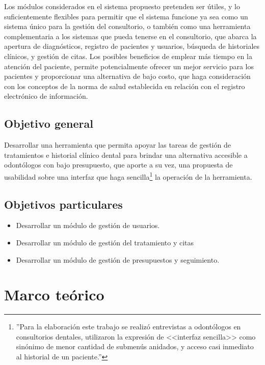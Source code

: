 \vspace{1em}

Los módulos considerados en el sistema propuesto pretenden ser útiles, y lo suficientemente flexibles para permitir que el sistema funcione ya sea como un sistema único para la gestión del consultorio, o también como una herramienta complementaria a los sistemas que pueda tenerse en el consultorio, que abarca la apertura de diagnósticos, registro de pacientes y usuarios, búsqueda de historiales clínicos, y gestión de citas. Los posibles beneficios de emplear más tiempo en la atención del paciente, permite potencialmente ofrecer un mejor servicio para los pacientes y proporcionar una alternativa de bajo costo, que haga consideración con los conceptos de la norma de salud establecida en relación con el registro electrónico de información.


\subsection{Objetivo general}

Desarrollar una herramienta que permita apoyar las tareas de gestión de tratamientos e historial clínico dental para brindar una alternativa accesible a odontólogos con bajo presupuesto, que aporte a su vez, una propuesta de usabilidad sobre una interfaz que haga sencilla\footnote{''Para la elaboración este trabajo se realizó entrevistas a odontólogos en consultorios dentales, utilizaron la expresión de <<interfaz sencilla>> como sinónimo de menor cantidad de submenús anidados, y acceso casi inmediato al historial de un paciente.''} la operación de la herramienta.


\subsection{Objetivos particulares}

\begin{itemize}
\item Desarrollar un módulo de gestión de usuarios.
\item Desarrollar un módulo de gestión del tratamiento y citas
\item Desarrollar un módulo de gestión de presupuestos y seguimiento.
\end{itemize}

\newpage
\section{Marco teórico}

